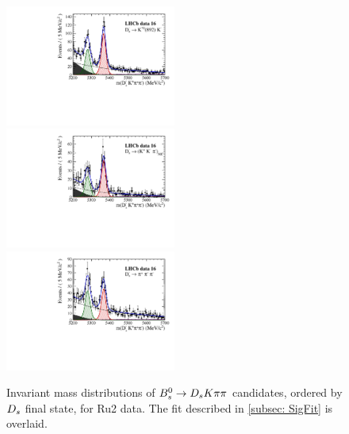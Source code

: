 \begin{figure}[h]
\includegraphics[height=!,width=0.5\textwidth]{figs/MassFit/signal_y16_KsK.pdf}
\includegraphics[height=!,width=0.5\textwidth]{figs/MassFit/signal_y16_KKpi_NR.pdf}
\includegraphics[height=!,width=0.5\textwidth]{figs/MassFit/signal_y16_pipipi.pdf}
\caption{Invariant mass distributions of ${{B}^0_{s}}\rightarrow{\ensuremath{{D}_{s}}}{\ensuremath{K}}{\ensuremath{\pi}}{\ensuremath{\pi}}$ candidates, ordered by ${{D}_{s}}$ final state, for Ru2 data.
The fit described in \ref{subsec: SigFit} is overlaid.}
\label{fig:massfits_signal_Run2}
\end{figure}

